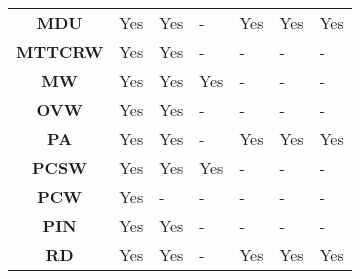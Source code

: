 \begin{table}[ht!]
\begin{tabular}{cllllll}
\textbf{MDU}         & Yes                                 & Yes                                 & -                                       & Yes                                      & Yes                                       & Yes                                       \\
\textbf{MTTCRW}      & Yes                                 & Yes                                 & -                                       & -                                        & -                                         & -                                         \\
\textbf{MW}          & Yes                                 & Yes                                 & Yes                                     & -                                        & -                                         & -                                         \\
\textbf{OVW}         & Yes                                 & Yes                                 & -                                       & -                                        & -                                         & -                                         \\
\textbf{PA}          & Yes                                 & Yes                                 & -                                       & Yes                                      & Yes                                       & Yes                                       \\
\textbf{PCSW}        & Yes                                 & Yes                                 & Yes                                     & -                                        & -                                         & -                                         \\
\textbf{PCW}         & Yes                                 & -                                   & -                                       & -                                        & -                                         & -                                         \\
\textbf{PIN}         & Yes                                 & Yes                                 & -                                       & -                                        & -                                         & -                                         \\
\textbf{RD}          & Yes                                 & Yes                                 & -                                       & Yes                                      & Yes                                       & Yes                                       \\

\end{tabular}
\end{table}
